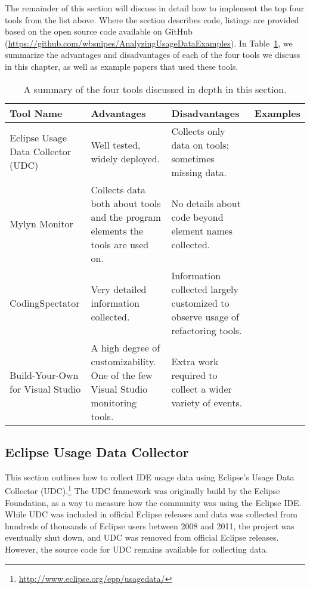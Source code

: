 
The remainder of this section will discuss in detail how to implement the top four tools from the list above.  Where the section describes code, listings are provided based on the open source code available on GitHub (\url{https://github.com/wbsnipes/AnalyzingUsageDataExamples}). 
In Table~\ref{tab:toolsummary}, we summarize the advantages and disadvantages of each of the four tools we discuss in this chapter, as well as example papers that
used these tools.

\begin{table}
\renewcommand{\arraystretch}{1.5}
\begin{small}
\begin{tabular}{p{2cm}p{4cm}p{4cm}p{4cm}}
\textbf{Tool Name}&\textbf{Advantages}&\textbf{Disadvantages}&\textbf{Examples}\\
\hline
Eclipse Usage Data Collector (UDC)&Well tested, widely deployed.&Collects only data on tools; sometimes missing data.&\cite{liu2012initial,parnin2011resumption,murphy2012we}\\
Mylyn Monitor&Collects data both about tools and the program elements the tools are used on.&No details about code beyond element names collected.&\cite{Kersten-Mylyn,ying2011influence,murphy2009using}\\
CodingSpectator&Very detailed information collected.&Information collected largely customized to observe usage of refactoring tools.&\cite{VakilianETAL2011Richer,VakilianETAL2012UseDisuseMisuse,NegaraETAL2012Dangerous}\\
Build-Your-Own for Visual Studio&A high degree of customizability. One of the few Visual Studio monitoring tools.&Extra work required to collect a wider variety of events.&\cite{SnipesExperiencesGamifyingSoftwareDevelopment}\\
\end{tabular}
\end{small}
\caption{A summary of the four tools discussed in depth in this section.}\label{tab:toolsummary}
\end{table}

\subsection{Eclipse Usage Data Collector}
\label{EclipseUsageDataCollector}
This section outlines how to collect IDE usage data using Eclipse's Usage Data
Collector (UDC).\footnote{\url{http://www.eclipse.org/epp/usagedata/}}
The UDC framework was originally build by the Eclipse Foundation, as a way to measure how the
community was using the Eclipse IDE.
While UDC was included in official Eclipse releases and data was collected from
hundreds of thousands of Eclipse users between 2008 and 2011, the project was eventually shut down,
and UDC was removed from official Eclipse releases.
However, the source code for UDC remains available for collecting data.


